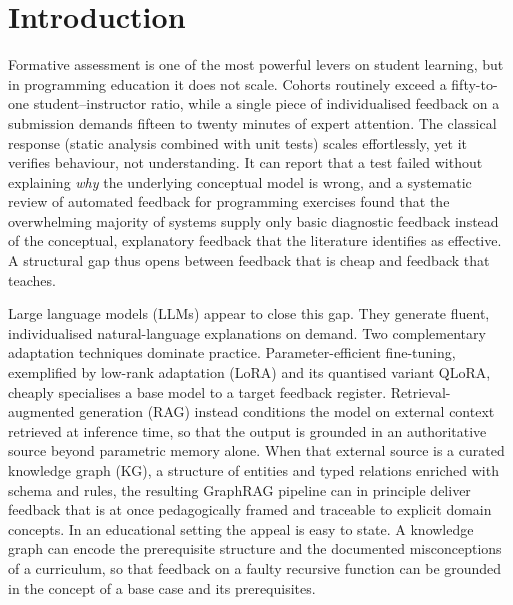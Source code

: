 \documentclass[sageh]{sagej}
\begin{document}
\section{Introduction}
Formative assessment is one of the most powerful levers on student learning, but in programming education it does not scale. Cohorts routinely exceed a fifty-to-one student--instructor ratio, while a single piece of individualised feedback on a submission demands fifteen to twenty minutes of expert attention. The classical response (static analysis combined with unit tests) scales effortlessly, yet it verifies behaviour, not understanding. It can report that a test failed without explaining \emph{why} the underlying conceptual model is wrong, and a systematic review of automated feedback for programming exercises found that the overwhelming majority of systems supply only basic diagnostic feedback instead of the conceptual, explanatory feedback that the literature identifies as effective.\cite{keuning2019slr,hattie2007feedback} A structural gap thus opens between feedback that is cheap and feedback that teaches.

Large language models (LLMs) appear to close this gap. They generate fluent, individualised natural-language explanations on demand. Two complementary adaptation techniques dominate practice. Parameter-efficient fine-tuning, exemplified by low-rank adaptation (LoRA) and its quantised variant QLoRA, cheaply specialises a base model to a target feedback register.\cite{hu2021lora,dettmers2023qlora,yang2025lora} Retrieval-augmented generation (RAG) instead conditions the model on external context retrieved at inference time, so that the output is grounded in an authoritative source beyond parametric memory alone.\cite{lewis2020rag} When that external source is a curated knowledge graph (KG), a structure of entities and typed relations enriched with schema and rules\cite{hogan2021kgsurvey}, the resulting GraphRAG pipeline can in principle deliver feedback that is at once pedagogically framed and traceable to explicit domain concepts.\cite{edge2024graphrag,peng2024graphrag,han2025graphrag} In an educational setting the appeal is easy to state. A knowledge graph can encode the prerequisite structure and the documented misconceptions of a curriculum, so that feedback on a faulty recursive function can be grounded in the concept of a base case and its prerequisites.\cite{christou2025ontology,bijl2025skilltrees,qu2024survey}
\end{document}
